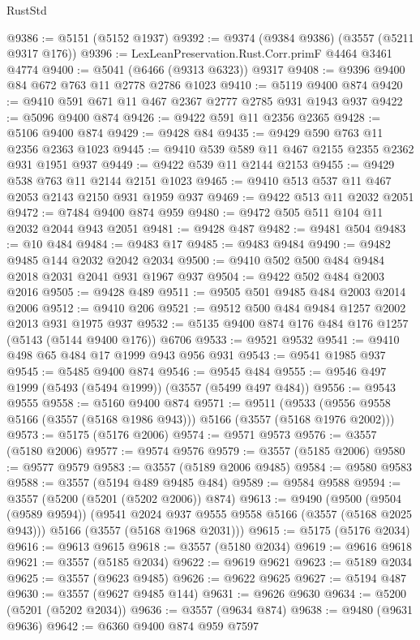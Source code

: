 \begin{lexlean}{RustStd}
\begin{coremodule}
@9386 := @5151 (@5152 @1937)
@9392 := @9374 (@9384 @9386) (@3557 (@5211 @9317 @176))
@9396 := LexLeanPreservation.Rust.Corr.primF @4464 @3461 @4774
@9400 := @5041 (@6466 (@9313 @6323)) @9317
@9408 := @9396 @9400 @84 @672 @763 @11 @2778 @2786 @1023
@9410 := @5119 @9400 @874
@9420 := @9410 @591 @671 @11 @467 @2367 @2777 @2785 @931 @1943 @937
@9422 := @5096 @9400 @874
@9426 := @9422 @591 @11 @2356 @2365
@9428 := @5106 @9400 @874
@9429 := @9428 @84
@9435 := @9429 @590 @763 @11 @2356 @2363 @1023
@9445 := @9410 @539 @589 @11 @467 @2155 @2355 @2362 @931 @1951 @937
@9449 := @9422 @539 @11 @2144 @2153
@9455 := @9429 @538 @763 @11 @2144 @2151 @1023
@9465 := @9410 @513 @537 @11 @467 @2053 @2143 @2150 @931 @1959 @937
@9469 := @9422 @513 @11 @2032 @2051
@9472 := @7484 @9400 @874 @959
@9480 := @9472 @505 @511 @104 @11 @2032 @2044 @943 @2051
@9481 := @9428 @487
@9482 := @9481 @504
@9483 := @10 @484
@9484 := @9483 @17
@9485 := @9483 @9484
@9490 := @9482 @9485 @144 @2032 @2042 @2034
@9500 := @9410 @502 @500 @484 @9484 @2018 @2031 @2041 @931 @1967 @937
@9504 := @9422 @502 @484 @2003 @2016
@9505 := @9428 @489
@9511 := @9505 @501 @9485 @484 @2003 @2014 @2006
@9512 := @9410 @206
@9521 := @9512 @500 @484 @9484 @1257 @2002 @2013 @931 @1975 @937
@9532 := @5135 @9400 @874 @176 @484 @176 @1257 (@5143 (@5144 @9400 @176)) @6706
@9533 := @9521 @9532
@9541 := @9410 @498 @65 @484 @17 @1999 @943 @956 @931
@9543 := @9541 @1985 @937
@9545 := @5485 @9400 @874
@9546 := @9545 @484
@9555 := @9546 @497 @1999 (@5493 (@5494 @1999)) (@3557 (@5499 @497 @484))
@9556 := @9543 @9555
@9558 := @5160 @9400 @874
@9571 := @9511
    (@9533 (@9556 @9558 @5166 (@3557 (@5168 @1986 @943))) @5166 (@3557 (@5168 @1976 @2002)))
@9573 := @5175 (@5176 @2006)
@9574 := @9571 @9573
@9576 := @3557 (@5180 @2006)
@9577 := @9574 @9576
@9579 := @3557 (@5185 @2006)
@9580 := @9577 @9579
@9583 := @3557 (@5189 @2006 @9485)
@9584 := @9580 @9583
@9588 := @3557 (@5194 @489 @9485 @484)
@9589 := @9584 @9588
@9594 := @3557 (@5200 (@5201 (@5202 @2006)) @874)
@9613 := @9490
    (@9500
      (@9504 (@9589 @9594))
      (@9541 @2024 @937 @9555 @9558 @5166 (@3557 (@5168 @2025 @943)))
      @5166
      (@3557 (@5168 @1968 @2031)))
@9615 := @5175 (@5176 @2034)
@9616 := @9613 @9615
@9618 := @3557 (@5180 @2034)
@9619 := @9616 @9618
@9621 := @3557 (@5185 @2034)
@9622 := @9619 @9621
@9623 := @5189 @2034
@9625 := @3557 (@9623 @9485)
@9626 := @9622 @9625
@9627 := @5194 @487
@9630 := @3557 (@9627 @9485 @144)
@9631 := @9626 @9630
@9634 := @5200 (@5201 (@5202 @2034))
@9636 := @3557 (@9634 @874)
@9638 := @9480 (@9631 @9636)
@9642 := @6360 @9400 @874 @959 @7597

\end{coremodule}
\end{lexlean}
